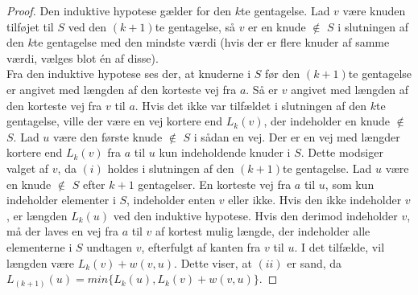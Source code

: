 \begin{proof}
	Den induktive hypotese gælder for den $k$te gentagelse. 
	Lad $v$ være knuden tilføjet til $S$ ved den $(k+1)$te gentagelse, så $v$ er en knude $\not\in$ $S$ i slutningen af den $k$te gentagelse med den mindste værdi (hvis der er flere knuder af samme værdi, vælges blot én af disse). \\
	Fra den induktive hypotese ses der, at knuderne i $S$ før den $(k+1)$te gentagelse er angivet med længden af den korteste vej fra $a$. 
	Så er $v$ angivet med længden af den korteste vej fra $v$ til $a$. 
	Hvis det ikke var tilfældet i slutningen af den $k$te gentagelse, ville der være en vej kortere end $L_k(v)$, der indeholder en knude $\not\in$ $S$. 
	Lad $u$ være den første knude $\not\in$ $S$ i sådan en vej. 
	Der er en vej med længder kortere end $L_k(v)$ fra $a$ til $u$ kun indeholdende knuder i $S$. 
	Dette modsiger valget af $v$, da $(i)$ holdes i slutningen af den $(k+1)$te gentagelse.
	Lad $u$ være en knude $\not\in$ $S$ efter $k+1$ gentagelser. 
	En korteste vej fra $a$ til $u$, som kun indeholder elementer i $S$, indeholder enten $v$ eller ikke. 
	Hvis den ikke indeholder $v$, er længden $L_k(u)$ ved den induktive hypotese. 
	Hvis den derimod indeholder $v$, må der laves en vej fra $a$ til $v$ af kortest mulig længde, der indeholder alle elementerne i $S$ undtagen $v$, efterfulgt af kanten fra $v$ til $u$. I det tilfælde, vil længden være $L_k(v)+w(v,u)$. Dette viser, at $(ii)$ er sand, da $L_(k+1)(u)=min \lbrace L_k(u), L_k(v)+w(v,u) \rbrace$. 
\end{proof}
